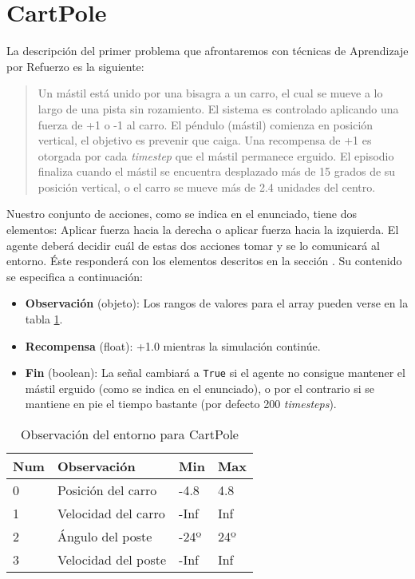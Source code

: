 \section{CartPole}
\label{cartpole-sec}
La descripción del primer problema que afrontaremos con técnicas de Aprendizaje por Refuerzo es la siguiente:

\begin{quote}
    Un mástil está unido por una bisagra a un carro, el cual se mueve a lo largo de una pista sin rozamiento. El sistema es controlado aplicando una fuerza de +1 o -1 al carro. El péndulo (mástil) comienza en posición vertical, el objetivo es prevenir que caiga. Una recompensa de +1 es otorgada por cada \textit{timestep} que el mástil permanece erguido. El episodio finaliza cuando el mástil se encuentra desplazado más de 15 grados de su posición vertical, o el carro se mueve más de 2.4 unidades del centro.
\end{quote}

Nuestro conjunto de acciones, como se indica en el enunciado, tiene dos elementos: Aplicar fuerza hacia la derecha o aplicar fuerza hacia la izquierda. El agente deberá decidir cuál de estas dos acciones tomar y se lo comunicará al entorno. Éste responderá con los elementos descritos en la sección \label{sec:openai}. Su contenido se especifica a continuación:

\begin{itemize}
    \item \textbf{Observación} (objeto): Los rangos de valores para el array pueden verse en la tabla \ref{obs-cartpole}.
    \item \textbf{Recompensa} (float): +1.0 mientras la simulación continúe.
    \item \textbf{Fin} (boolean): La señal cambiará a \texttt{True} si el agente no consigue mantener el mástil erguido (como se indica en el enunciado), o por el contrario si se mantiene en pie el tiempo bastante (por defecto 200 \textit{timesteps}).
\end{itemize}
\begin{table}[]
    \centering
    \begin{tabular}{|l|l|l|l|}
    \hline
    \textbf{Num} & \textbf{Observación} & \textbf{Min} & \textbf{Max} \\ \hline
    0            & Posición del carro   & -4.8         & 4.8          \\ \hline
    1            & Velocidad del carro  & -Inf         & Inf          \\ \hline
    2            & Ángulo del poste     & -24º         & 24º          \\ \hline
    3            & Velocidad del poste  & -Inf         & Inf          \\ \hline
    \end{tabular}
    \caption{Observación del entorno para CartPole}
    \label{obs-cartpole}
\end{table}

